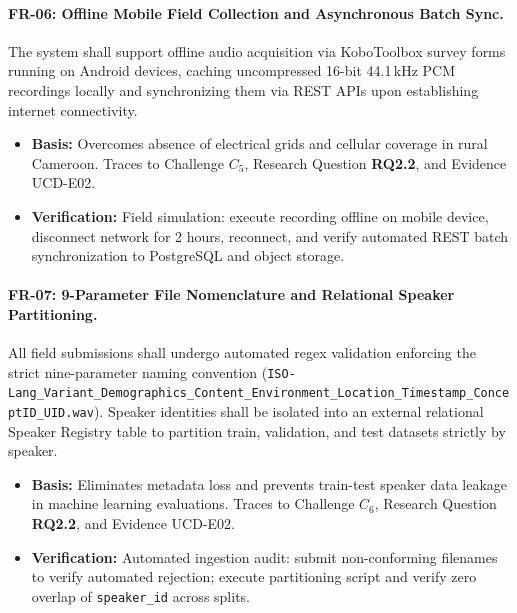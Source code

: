 \documentclass[a4paper,11pt]{article}
\begin{document}
\paragraph{FR-06: Offline Mobile Field Collection and Asynchronous Batch Sync.}
The system shall support offline audio acquisition via KoboToolbox survey forms running on Android devices, caching uncompressed 16-bit 44.1\,kHz PCM recordings locally and synchronizing them via REST APIs upon establishing internet connectivity.
\begin{itemize}
    \item \textbf{Basis:} Overcomes absence of electrical grids and cellular coverage in rural Cameroon. Traces to Challenge $C_5$, Research Question \textbf{RQ2.2}, and Evidence UCD-E02.
    \item \textbf{Verification:} Field simulation: execute recording offline on mobile device, disconnect network for 2 hours, reconnect, and verify automated REST batch synchronization to PostgreSQL and object storage.
\end{itemize}

\paragraph{FR-07: 9-Parameter File Nomenclature and Relational Speaker Partitioning.}
All field submissions shall undergo automated regex validation enforcing the strict nine-parameter naming convention (\texttt{ISO-Lang\_}\allowbreak\texttt{Variant\_}\allowbreak\texttt{Demographics\_}\allowbreak\texttt{Content\_}\allowbreak\texttt{Environment\_}\allowbreak\texttt{Location\_}\allowbreak\texttt{Timestamp\_}\allowbreak\texttt{ConceptID\_}\allowbreak\texttt{UID.wav}). Speaker identities shall be isolated into an external relational Speaker Registry table to partition train, validation, and test datasets strictly by speaker.
\begin{itemize}
    \item \textbf{Basis:} Eliminates metadata loss and prevents train-test speaker data leakage in machine learning evaluations. Traces to Challenge $C_6$, Research Question \textbf{RQ2.2}, and Evidence UCD-E02.
    \item \textbf{Verification:} Automated ingestion audit: submit non-conforming filenames to verify automated rejection; execute partitioning script and verify zero overlap of \texttt{speaker\_id} across splits.
\end{itemize}
\end{document}
